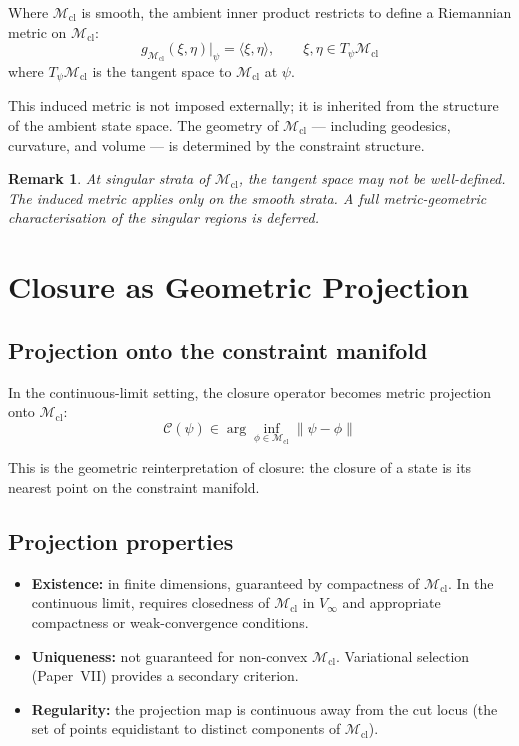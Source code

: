 \documentclass[12pt]{article}
\newtheorem{remark}[theorem]{Remark}
\newcommand{\Mcl}{\mathcal{M}_{\mathrm{cl}}}
\newcommand{\Ccal}{\mathcal{C}}
\begin{document}
Where $\Mcl$ is smooth, the ambient inner product restricts to define a Riemannian metric on $\Mcl$:
\begin{equation}
    g_{\Mcl}(\xi, \eta)\big|_\psi = \langle\xi, \eta\rangle, \qquad \xi, \eta \in T_\psi \Mcl
\end{equation}
where $T_\psi \Mcl$ is the tangent space to $\Mcl$ at $\psi$.

This induced metric is not imposed externally; it is inherited from the structure of the ambient state space. The geometry of $\Mcl$ --- including geodesics, curvature, and volume --- is determined by the constraint structure.

\begin{remark}
At singular strata of $\Mcl$, the tangent space may not be well-defined. The induced metric applies only on the smooth strata. A full metric-geometric characterisation of the singular regions is deferred.
\end{remark}

\section{Closure as Geometric Projection}\label{sec:projection}

\subsection{Projection onto the constraint manifold}

In the continuous-limit setting, the closure operator becomes metric projection onto $\Mcl$:
\begin{equation}\label{eq:projection}
    \Ccal(\psi) \in \arg\inf_{\phi \in \Mcl} \|\psi - \phi\|
\end{equation}

This is the geometric reinterpretation of closure: the closure of a state is its nearest point on the constraint manifold.

\subsection{Projection properties}

\begin{itemize}
    \item \textbf{Existence:} in finite dimensions, guaranteed by compactness of $\Mcl$. In the continuous limit, requires closedness of $\Mcl$ in $V_\infty$ and appropriate compactness or weak-convergence conditions.
    \item \textbf{Uniqueness:} not guaranteed for non-convex $\Mcl$. Variational selection (Paper~VII) provides a secondary criterion.
    \item \textbf{Regularity:} the projection map is continuous away from the cut locus (the set of points equidistant to distinct components of $\Mcl$).
\end{itemize}
\end{document}
